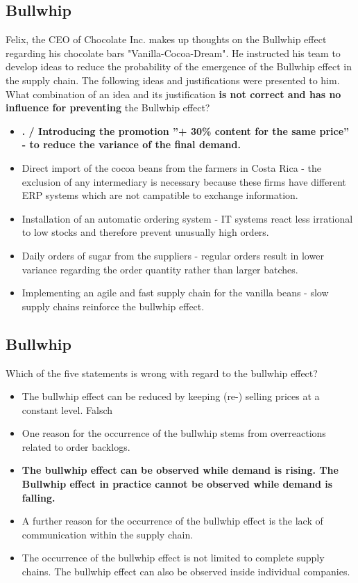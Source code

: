 \subsection{Bullwhip}
Felix, the CEO of Chocolate Inc. makes up thoughts on the Bullwhip effect regarding his chocolate bars "Vanilla-Cocoa-Dream". He instructed his team to develop ideas to reduce the probability of  the emergence of the Bullwhip effect in the supply chain. The following ideas and justifications were presented to him. 
What combination of an idea and its justification \textbf{is not correct and has no influence for preventing} the Bullwhip effect?
\begin{itemize}
	\item \textbf{. / Introducing the promotion ''+ 30\% content for the same price'' - to reduce the variance of the final demand. }
	\item Direct import of the cocoa beans from the farmers in Costa Rica - the exclusion of any intermediary is necessary because these firms have different ERP systems which are not campatible to exchange information. 
	\item Installation of an automatic ordering system - IT systems react less irrational to low stocks and therefore prevent unusually high orders. 
	\item Daily orders of sugar from the suppliers - regular orders result in lower variance regarding the order quantity rather than larger batches.
	\item Implementing an agile and fast supply chain for the vanilla beans - slow supply chains reinforce the bullwhip effect.
\end{itemize}
\subsection{Bullwhip}
Which of the five statements is wrong with regard to the bullwhip effect?
\begin{itemize}
	\item The bullwhip effect can be reduced by keeping (re-) selling prices at a constant level. Falsch
	\item One reason for the occurrence of the bullwhip stems from overreactions related to order backlogs.
	\item \textbf{The bullwhip effect can be observed while demand is rising. The Bullwhip effect in practice cannot be observed while demand is falling.}
	\item A further reason for the occurrence of the bullwhip effect is the lack of communication within the supply chain.
	\item The occurrence of the bullwhip effect is not limited to complete supply chains. The bullwhip effect can also be observed inside individual companies.
\end{itemize}

